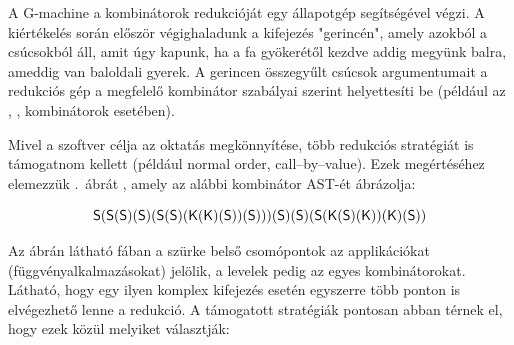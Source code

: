 \documentclass[a4paper,oneside,12pt]{article}
\begin{document}
A \foreignlanguage{english}{G-machine} a kombinátorok redukcióját egy állapotgép segítségével végzi. A kiértékelés során először végighaladunk a kifejezés "gerincén", amely azokból a csúcsokból áll, amit úgy kapunk, ha a fa gyökerétől kezdve addig megyünk balra, ameddig van baloldali gyerek. A gerincen összegyűlt csúcsok argumentumait a redukciós gép a megfelelő kombinátor szabályai szerint helyettesíti be (például az \Scomb, \Kcomb, \Icomb kombinátorok esetében).

Mivel a szoftver célja az oktatás megkönnyítése, több redukciós stratégiát is támogatnom kellett (például \foreignlanguage{english}{normal order}, \foreignlanguage{english}{call--by--value}). Ezek megértéséhez elemezzük .~ábrát \cite{wolframCombinatorsCentennialView2020}, amely az alábbi kombinátor AST-ét ábrázolja:

\[
  \textsf{S}(\textsf{S}(\textsf{S})(\textsf{S})(\textsf{S}(\textsf{S})(\textsf{K}(\textsf{K})(\textsf{S}))(\textsf{S})))(\textsf{S})(\textsf{S})(\textsf{S}(\textsf{K}(\textsf{S})(\textsf{K}))(\textsf{K})(\textsf{S}))
\]

Az ábrán látható fában a szürke belső csomópontok az applikációkat (függvényalkalmazásokat) jelölik, a levelek pedig az egyes kombinátorokat. Látható, hogy egy ilyen komplex kifejezés esetén egyszerre több ponton is elvégezhető lenne a redukció. A támogatott stratégiák pontosan abban térnek el, hogy ezek közül melyiket választják:
\end{document}
